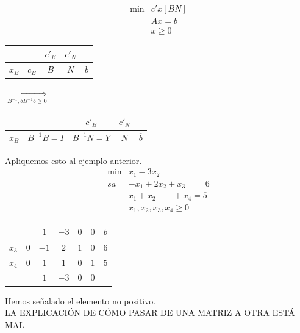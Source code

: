 \documentclass[PM.tex]{subfiles}
\begin{document}
\begin{align*}
\min & c'x [B N]\\
& Ax=b\\
&x\geq 0
\end{align*}
\begin{tabular}{|c|c| c| c|c|}
\hline
 & & $c'_B$ & $c'_N$ & \\
 \hline
 $x_B$ & $c_B$ & $B$ & $N$ & $b$\\
 \hline

\end{tabular}$\underset{B^{-1},\overline{b}B^{-1}b\geq 0}{\Longrightarrow}$
\begin{tabular}{|c|c| c| c|c|}
\hline
 & & $c'_B$ & $c'_N$ & \\
 \hline
 $x_B$ & $B^{-1}B=I$ & $B^{-1}N=Y$ & $N$ & $\overline{b}$\\
 \hline

\end{tabular}
Apliquemos esto al ejemplo anterior.
\begin{align*}
\min &x_1-3x_2\\
sa & -x_1+2x_2+x_3 \quad = 6\\
   & x_1+x_2 \qquad +x_4 = 5\\
   &x_1,x_2,x_3,x_4\geq 0
\end{align*}
\begin{tabular}{|c|c| c c| c c|c|}
\hline
 &            & $1$ & $-3$ & $0$ & $0$ & $b$  \\
 \hline
 $x_3$ & $0$ & $-1$ & $2$ &   $1$ &   $0$ & $6$\\
  $x_4$ & $0$ & $1$ & $1$ &    $0$ &  $1$ & $5$\\
 \hline
 &            & $1$ & $\boxed{-3}$ & $0$ & $0$ & \\
 \hline

\end{tabular}
Hemos señalado el elemento no positivo. \\

LA EXPLICACIÓN DE CÓMO PASAR DE UNA MATRIZ A OTRA ESTÁ MAL
\end{document}
